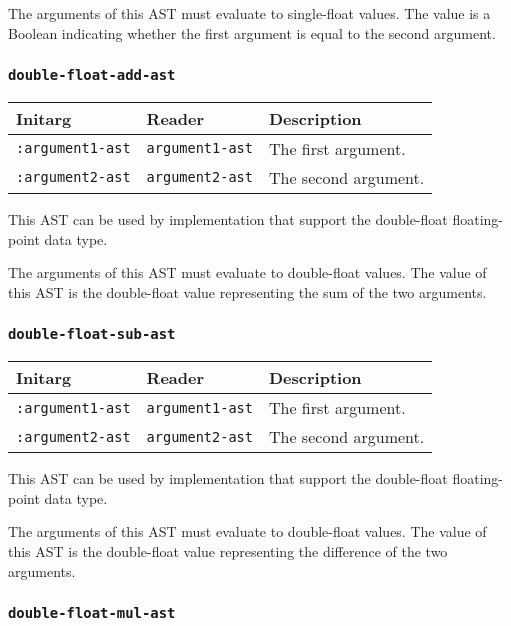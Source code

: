The arguments of this AST must evaluate to single-float
values.  The value is a Boolean indicating whether the first argument
is equal to the second argument.

\subsubsection{\texttt{double-float-add-ast}}
\label{sec-ast-double-float-add}

\begin{tabular}{|l|l|l|}
\hline
Initarg & Reader & Description\\
\hline\hline
\texttt{:argument1-ast} & \texttt{argument1-ast} & The first argument.\\
\hline
\texttt{:argument2-ast} & \texttt{argument2-ast} & The second argument.\\
\hline
\end{tabular}

This AST can be used by implementation that support the double-float
floating-point data type.  

The arguments of this AST must evaluate to double-float
values.  The value of this AST is the double-float value
representing the sum of the two arguments.

\subsubsection{\texttt{double-float-sub-ast}}
\label{sec-ast-double-float-sub}

\begin{tabular}{|l|l|l|}
\hline
Initarg & Reader & Description\\
\hline\hline
\texttt{:argument1-ast} & \texttt{argument1-ast} & The first argument.\\
\hline
\texttt{:argument2-ast} & \texttt{argument2-ast} & The second argument.\\
\hline
\end{tabular}

This AST can be used by implementation that support the double-float
floating-point data type.  

The arguments of this AST must evaluate to double-float
values.  The value of this AST is the double-float value
representing the difference of the two arguments.

\subsubsection{\texttt{double-float-mul-ast}}
\label{sec-ast-double-float-mul}

